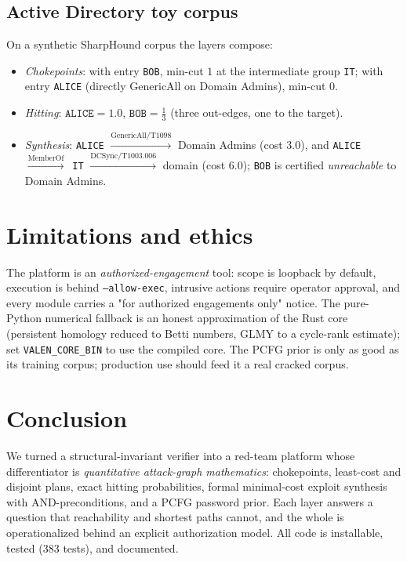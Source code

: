 \documentclass[11pt]{article}
\begin{document}
\subsection{Active Directory toy corpus}
On a synthetic SharpHound corpus the layers compose:
\begin{itemize}[itemsep=1pt]
  \item \emph{Chokepoints}: with entry \texttt{BOB}, min-cut $1$ at the
        intermediate group \texttt{IT}; with entry \texttt{ALICE} (directly
        GenericAll on Domain Admins), min-cut $0$.
  \item \emph{Hitting}: $\texttt{ALICE}=1.0$, $\texttt{BOB}=\tfrac13$ (three
        out-edges, one to the target).
  \item \emph{Synthesis}: \texttt{ALICE} $\xrightarrow{\text{GenericAll/T1098}}$
        Domain Admins (cost $3.0$), and \texttt{ALICE}
        $\xrightarrow{\text{MemberOf}}\,$ \texttt{IT}
        $\xrightarrow{\text{DCSync/T1003.006}}$ domain (cost $6.0$); \texttt{BOB}
        is certified \emph{unreachable} to Domain Admins.
\end{itemize}

\section{Limitations and ethics}
The platform is an \emph{authorized-engagement} tool: scope is loopback by
default, execution is behind \texttt{--allow-exec}, intrusive actions require
operator approval, and every module carries a "for authorized engagements only"
notice. The pure-Python numerical fallback is an honest approximation of the Rust
core (persistent homology reduced to Betti numbers, GLMY to a cycle-rank
estimate); set \texttt{VALEN\_CORE\_BIN} to use the compiled core. The PCFG prior
is only as good as its training corpus; production use should feed it a real
cracked corpus.

\section{Conclusion}
We turned a structural-invariant verifier into a red-team platform whose
differentiator is \emph{quantitative attack-graph mathematics}: chokepoints,
least-cost and disjoint plans, exact hitting probabilities, formal minimal-cost
exploit synthesis with AND-preconditions, and a PCFG password prior. Each layer
answers a question that reachability and shortest paths cannot, and the whole is
operationalized behind an explicit authorization model. All code is installable,
tested (383 tests), and documented.
\end{document}
